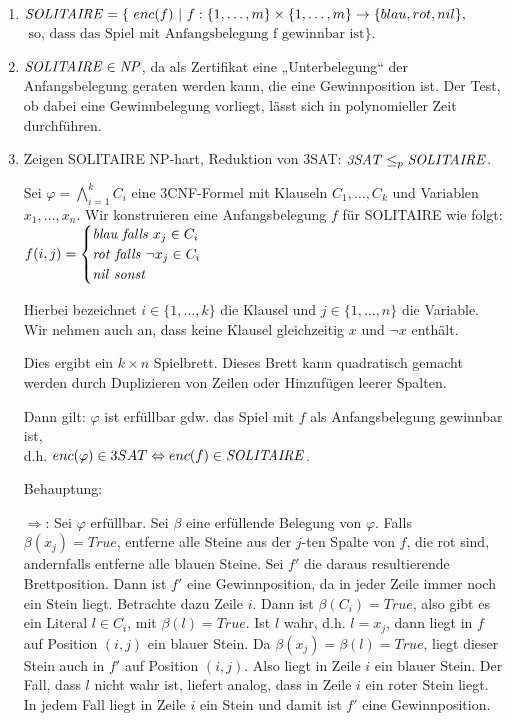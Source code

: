     \LOES
    \begin{enumerate}
        \item $\mathit{SOLITAIRE} = \{\ enc(f)\ |\ f: \{ 1,\dots,m \} \times \{ 1,\dots,m \} \to \{ blau, rot, nil \},$ \\
            $\text{\ \ so,\ dass\ das\ Spiel\ mit\ Anfangsbelegung\ f\ gewinnbar\ ist} \}$.

        \item $\mathit{SOLITAIRE} \in \mathit{NP}$, da als Zertifikat eine „Unterbelegung“ der Anfangsbelegung geraten werden kann, die eine Gewinnposition ist.
            Der Test, ob dabei eine Gewinnbelegung vorliegt, lässt sich in polynomieller Zeit durchführen.

\newpage
        \item Zeigen SOLITAIRE NP-hart, Reduktion von 3SAT: $\mathit{3SAT} \leq_{p} \mathit{SOLITAIRE}$.

            Sei $\varphi = \bigwedge\limits_{i=1}^{k} C_{i}$ eine 3CNF-Formel mit Klauseln $C_{1}, \dots, C_{k}$ und Variablen $x_{1}, \dots, x_{n}$.
            Wir konstruieren eine Anfangsbelegung $f$ für SOLITAIRE wie folgt:
            $f(i,j) =
            \begin{cases}
                \mathit{blau\ falls\ } x_{j} \in C_{i} \\
                \mathit{rot\ falls\ } \neg x_{j} \in C_{i} \\
                \mathit{nil\ sonst}
            \end{cases}$

            Hierbei bezeichnet $i \in \{ 1,\dots,k \}$ die Klausel und $j \in \{ 1,\dots,n \}$ die Variable. Wir nehmen auch an, dass keine Klausel gleichzeitig $x$ und $\neg x$ enthält.

            Dies ergibt ein $k \times n$ Spielbrett. Dieses Brett kann quadratisch gemacht werden durch Duplizieren von Zeilen oder Hinzufügen leerer Spalten.

            Dann gilt: $\varphi$ ist erfüllbar gdw. das Spiel mit $f$ als Anfangsbelegung gewinnbar ist, \\
            d.h. $enc(\varphi) \in 3SAT \Leftrightarrow enc(f) \in \mathit{SOLITAIRE}$.

            Behauptung: 

            $\Rightarrow$: Sei $\varphi$ erfüllbar. Sei $\beta$ eine erfüllende Belegung von $\varphi$. Falls $\beta(x_{j}) = True$, entferne alle Steine aus der $j$-ten Spalte von $f$, die rot sind, andernfalls entferne alle blauen Steine. Sei $f'$ die daraus resultierende Brettposition.
            Dann ist $f'$ eine Gewinnposition, da in jeder Zeile immer noch ein Stein liegt. Betrachte dazu Zeile $i$.
            Dann ist $\beta(C_{i}) = True$, also gibt es ein Literal $l \in C_{i}$, mit $\beta(l) = True$. Ist $l$ wahr, d.h. $l = x_{j}$, dann liegt in $f$ auf Position $(i,j)$ ein blauer Stein.
            Da $\beta(x_{j}) = \beta(l) = True$, liegt dieser Stein auch in $f'$ auf Position $(i,j)$. Also liegt in Zeile $i$ ein blauer Stein. Der Fall, dass $l$ nicht wahr ist, liefert analog, dass in Zeile $i$ ein roter Stein liegt. In jedem Fall liegt in Zeile $i$ ein Stein und damit ist $f'$ eine Gewinnposition.


\end{enumerate}
